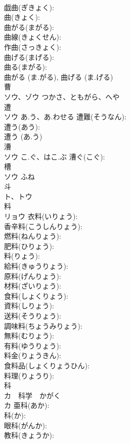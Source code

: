 \documentclass[8pt]{extreport}
\begin{document}
\begin{CJK}{UTF8}{min}
\\	戯曲(ぎきょく): 
\\	曲(きょく): 
\\	曲がる(まがる): 
\\	曲線(きょくせん): 
\\	作曲(さっきょく): 
\\	曲げる(まげる): 
\\	曲る(まがる): 
\\	曲がる (ま.がる), 曲げる (ま.げる)
\\	曹			
\\	ソウ、ゾウ	つかさ、ともがら、へや		
\\	遭			
\\	ソウ	あ.う、あ.わせる	遭難(そうなん): 
\\	遭う(あう): 
\\	遭う (あ.う)
\\	漕			
\\	ソウ	こ.ぐ、はこ.ぶ	漕ぐ(こぐ): 
\\	槽			
\\	ソウ	ふね		
\\	斗			
\\	ト、トウ			
\\	料			
\\	リョウ		衣料(いりょう): 
\\	香辛料(こうしんりょう): 
\\	燃料(ねんりょう): 
\\	肥料(ひりょう): 
\\	料(りょう): 
\\	給料(きゅうりょう): 
\\	原料(げんりょう): 
\\	材料(ざいりょう): 
\\	食料(しょくりょう): 
\\	資料(しりょう): 
\\	送料(そうりょう): 
\\	調味料(ちょうみりょう): 
\\	無料(むりょう): 
\\	有料(ゆうりょう): 
\\	料金(りょうきん): 
\\	食料品(しょくりょうひん): 
\\	料理(りょうり): 
\\	科			
\\	カ　科学　かがく 
\\	カ		亜科(あか): 
\\	科(か): 
\\	眼科(がんか): 
\\	教科(きょうか): 

\end{CJK}
\end{document}
